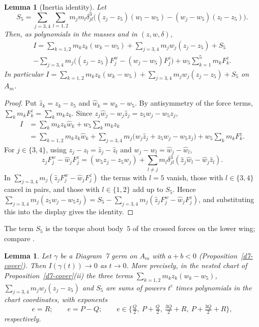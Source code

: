 \documentclass[Threeside,11pt]{article}
\newtheorem{lemma}[theorem]{Lemma}
\theoremstyle{definition}
\theoremstyle{remark}
\numberwithin{equation}{section}
\theoremstyle{remark}
\begin{document}
\begin{lemma}[Inertia identity]\label{d7-identity}
Let
\[
  S_5=\sum_{j=3,4}\sum_{l=1,2}m_jm_l\delta_{jl}^3
  \bigl((z_j-z_5)(w_l-w_5)-(w_j-w_5)(z_l-z_5)\bigr).
\]
Then, as polynomials in the masses and in $(z,w,\delta)$,
\begin{multline*}
  I=\sum_{k=1,2}m_kz_k(w_k-w_5)+\sum_{j=3,4}m_jw_j(z_j-z_5)+S_5\\
  -\sum_{j=3,4}m_j\bigl((z_j-z_5)F^w_j-(w_j-w_5)F^z_j\bigr)+w_5\sum_{k=1}^5m_kF^z_k.
\end{multline*}
In particular $I=\sum_{k=1,2}m_kz_k(w_k-w_5)+\sum_{j=3,4}m_jw_j(z_j-z_5)+S_5$ on $A_m$.
\end{lemma}

\begin{proof}
Put $\hat z_k=z_k-z_5$ and $\hat w_k=w_k-w_5$.  By antisymmetry of the force terms,
$\sum_km_kF^z_k=\sum_km_kz_k$.  Since $z_j\hat w_j-w_j\hat z_j=z_5w_j-w_5z_j$,
\begin{align*}
  I&=\sum_km_kz_k\hat w_k+w_5\sum_km_kz_k\\
   &=\sum_{k=1,2}m_kz_k\hat w_k+\sum_{j=3,4}m_j\bigl(w_j\hat z_j+z_5w_j-w_5z_j\bigr)
    +w_5\sum_km_kF^z_k.
\end{align*}
For $j\in\{3,4\}$, using $z_j-z_l=\hat z_j-\hat z_l$ and $w_j-w_l=\hat w_j-\hat w_l$,
\[
  \hat z_jF^w_j-\hat w_jF^z_j=(w_5z_j-z_5w_j)
  +\sum_{l\ne j}m_l\delta_{jl}^3(\hat z_j\hat w_l-\hat w_j\hat z_l).
\]
In $\sum_{j=3,4}m_j(\hat z_jF^w_j-\hat w_jF^z_j)$ the terms with $l=5$ vanish, those with
$l\in\{3,4\}$ cancel in pairs, and those with $l\in\{1,2\}$ add up to $S_5$.  Hence
$\sum_{j=3,4}m_j(z_5w_j-w_5z_j)=S_5-\sum_{j=3,4}m_j(\hat z_jF^w_j-\hat w_jF^z_j)$, and
substituting this into the display gives the identity.
\end{proof}

The term $S_5$ is the torque about body~$5$ of the crossed forces on the lower wing; compare
\cite[(31)]{AK}.

\begin{lemma}\label{d7-vanish}
Let $\gamma$ be a Diagram~7 germ on $A_m$ with $a+b<0$ (Proposition~\ref{d7-cover}).  Then
$I(\gamma(t))\to0$ as $t\to0$.
More precisely, in the nested chart of Proposition~\ref{d7-cover}(ii) the three terms
$\sum_{k=1,2}m_kz_k(w_k-w_5)$, $\sum_{j=3,4}m_jw_j(z_j-z_5)$ and $S_5$ are sums of powers $t^e$
times polynomials in the chart coordinates, with exponents
\[
  e=R;\qquad e=P-Q;\qquad e\in\bigl\{\tfrac Q2,\ P+\tfrac Q2,\ \tfrac{3Q}2+R,\ P+\tfrac{3Q}2+R\bigr\},
\]
respectively.
\end{lemma}
\end{document}
